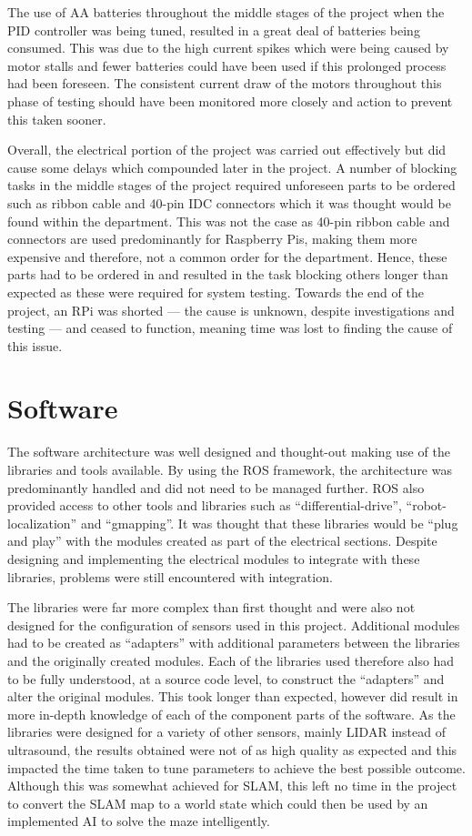 The use of AA batteries throughout the middle stages of the project when the PID
controller was being tuned, resulted in a great deal of batteries being consumed.
This was due to the high current spikes which were being caused by motor stalls and
fewer batteries could have been used if this prolonged process had been foreseen. The
consistent current draw of the motors throughout this phase of testing should have
been monitored more closely and action to prevent this taken sooner.

Overall, the electrical portion of the project was carried out effectively but did
cause some delays which compounded later in the project. A number of
blocking tasks in the middle stages of the project required unforeseen parts to be
ordered such as ribbon cable and 40-pin IDC connectors which it was thought would
be found within the department. This was not the case as 40-pin ribbon cable and
connectors are used predominantly for Raspberry Pis, making them more expensive
and therefore, not a common order for the department. Hence, these parts had to be ordered in and resulted in the task blocking
others longer than expected as these were required for system testing. Towards the end of the project, an RPi was
shorted --- the cause is unknown, despite investigations and testing --- and ceased to function,
meaning time was lost to finding the cause of this issue.

\section{Software}\label{eval/soft}
The software architecture was well designed and thought-out making use of the
libraries and tools available. By using the ROS framework, the architecture was predominantly handled
and did not need to be managed further. ROS also provided
access to other tools and libraries such as ``differential-drive'', ``robot-
localization'' and ``gmapping''. It was thought that these libraries would be ``plug
and play'' with the modules created as part of the electrical sections. Despite
designing and implementing the electrical modules to integrate with these libraries,
problems were still encountered with integration.

The libraries were far more complex than first thought and were also not designed for
the configuration of sensors used in this project. Additional modules had to be
created as ``adapters'' with additional parameters between the libraries and the
originally created modules. Each of the libraries used therefore also had to be fully
understood, at a source code level, to construct the ``adapters'' and alter
the original modules. This took longer than expected, however did result in more in-depth knowledge of each of the component parts of the software. As the libraries were
designed for a variety of other sensors, mainly LIDAR instead of ultrasound, the
results obtained were not of as high quality as expected and this impacted the time
taken to tune parameters to achieve the best possible outcome. Although this was
somewhat achieved for SLAM, this left no time in the project to convert the SLAM map
to a world state which could then be used by an implemented AI to solve the maze
intelligently.

